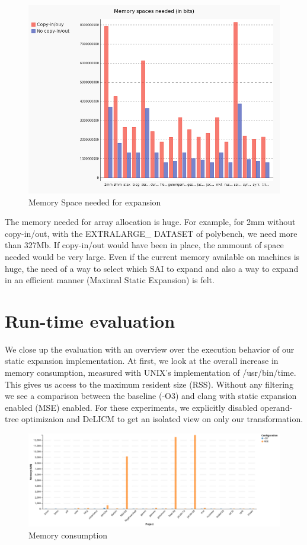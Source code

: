 \begin{figure}
\centering
\includegraphics[scale=0.4]{gfx/Evaluation/MemorySpace.png}
\caption{Memory Space needed for expansion}
\label{fig:MemorySpace}
\end{figure}

The memory needed for array allocation is huge. For example, for 2mm without copy-in/out, with the EXTRALARGE\_ DATASET of polybench, we need more than 327Mb. If copy-in/out would have been in place, the ammount of space needed would be very large. Even if the current memory available on machines is huge, the need of a way to select which SAI to expand and also a way to expand in an efficient manner (Maximal Static Expansion) is felt.

\section{Run-time evaluation}
We close up the evaluation with an overview over the execution behavior of our static expansion implementation. At first, we look at the overall increase in memory consumption, measured with UNIX’s implementation of /usr/bin/time. This gives us access to the maximum resident size (RSS). Without any filtering we see a comparison between the baseline (-O3) and clang with static expansion enabled (MSE) enabled. For these experiments, we explicitly disabled operand-tree optimizaion and DeLICM to get an isolated view on only our transformation.

\begin{figure}
\centering
\includegraphics[angle=90,origin=c,scale=0.5]{gfx/Evaluation/RT-1.png}
\caption{Memory consumption}
\label{fig:RT-1}
\end{figure}

